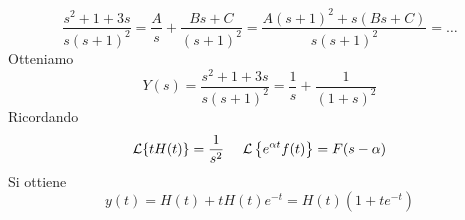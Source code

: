 \begin{equation*}
\frac{s^{2} + 1 + 3s}{s(s + 1)^{2}} = \frac{A}{s} + \frac{Bs + C}{(s + 1)^{2}} = \frac{A(s + 1)^{2} + s(Bs + C)}{s(s + 1)^{2}} = \dotsc 
\end{equation*}
Otteniamo
\begin{equation*}
Y(s) = \frac{s^{2} + 1 + 3s}{s(s + 1)^{2}} = \frac{1}{s} + \frac{1}{(1 + s)^{2}}
\end{equation*}
Ricordando
\begin{equation*}
\Lc\{tH(t)\} = \frac{1}{s^{2}} \ \ \ \ \Lc\left\{e^{\alpha t} f(t)\right\} = F(s - \alpha)
\end{equation*}
Si ottiene
\begin{equation*}
y(t) = H(t) + tH(t) e^{- t} = H(t)\left(1 + te^{- t}\right)
\end{equation*}
\Soluzione

